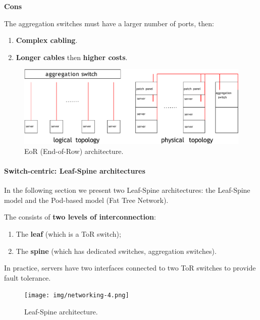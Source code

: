\begin{itemize}
    \begin{flushleft}
        \textcolor{Red2}{ \textbf{Cons}}
    \end{flushleft}
    The aggregation switches must have a larger number of ports, then:
    \begin{enumerate}
        \item \textbf{Complex cabling}.
        \item \textbf{Longer cables} then \textbf{higher costs}.
    \end{enumerate}
    \begin{figure}[!htp]
        \centering
        \includegraphics[width=.9\textwidth]{img/networking-3.pdf}
        \caption{EoR (End-of-Row) architecture.}
    \end{figure}
\end{itemize}

\newpage

\paragraph{Switch-centric: Leaf-Spine architectures}

In the following section we present two Leaf-Spine architectures: the Leaf-Spine model and the Pod-based model (Fat Tree Network).

\highspace
The  consists of \textbf{two levels of interconnection}:
\begin{enumerate}
    \item The \textbf{leaf} (which is a ToR switch);
    \item The \textbf{spine} (which has dedicated switches, aggregation switches).
\end{enumerate}
In practice, servers have two interfaces connected to two ToR switches to provide fault tolerance.
\begin{figure}[!htp]
    \centering
    \texttt{[image: img/networking-4.png]}
    \caption{Leaf-Spine architecture.}
\end{figure}

